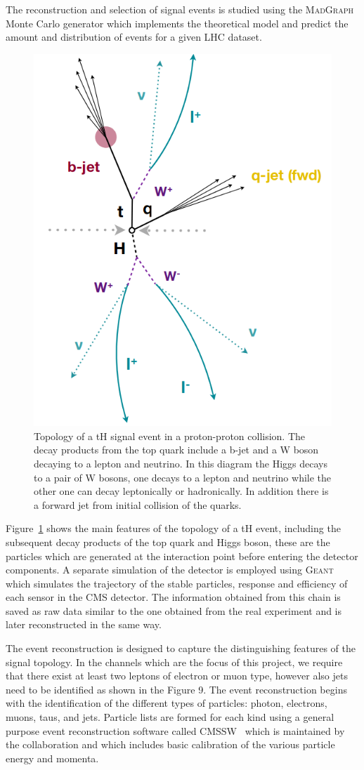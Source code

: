 \documentclass[final,3p]{CSP}
\begin{document}
The reconstruction and selection of signal events is studied using the \textsc{MadGraph}~\cite{alwall2014automated} Monte Carlo generator which implements the theoretical model and predict the amount and distribution of events for a given LHC dataset.


\begin{figure}[H]
	\centering
	\includegraphics[width=0.5\columnwidth]{./topology.png}
	\caption{Topology of a tH signal event in a proton-proton collision. The decay products from the top quark include a b-jet and a W boson decaying to a lepton and neutrino. In this diagram the Higgs decays to a pair of W bosons, one decays to a lepton and neutrino while the other one can decay leptonically or hadronically. In addition there is a forward jet from initial collision of the quarks.}
	\label{figureTopology}
\end{figure}
Figure~\ref{figureTopology} shows the main features of the topology of a tH event, including the subsequent decay products of the top quark and Higgs boson, these are the particles which are generated at the interaction point before entering the detector components.
A separate simulation of the detector is employed using \textsc{Geant}~\cite{agostinelli2003geant4} which simulates the trajectory of the stable particles, response and efficiency of each sensor in the CMS detector.
The information obtained from this chain is saved as raw data similar to the one obtained from the real experiment and is later reconstructed in the same way.

The event reconstruction is designed to capture the distinguishing features of the signal topology.
In the channels which are the focus of this project, we require that there exist at least two leptons of electron or muon type, however also jets need to be identified as shown in the Figure 9.
The event reconstruction begins with the identification of the different types of particles: photon, electrons, muons, taus, and jets.
Particle lists are formed for each kind using a general purpose event reconstruction software called \textsc{CMSSW}~\cite{Bayatian:922757} which is maintained by the collaboration and which includes basic calibration of the various particle energy and momenta.
\end{document}
